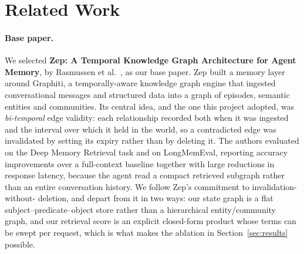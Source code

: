 \documentclass[11pt,a4paper]{article}
\begin{document}
\section{Related Work}
\label{sec:related}

\paragraph{Base paper.} We selected \textbf{Zep: A Temporal Knowledge Graph
Architecture for Agent Memory}, by Rasmussen et al.~\cite{rasmussen2025zep}, as
our base paper. Zep built a memory layer around Graphiti, a temporally-aware
knowledge graph engine that ingested conversational messages and structured
data into a graph of episodes, semantic entities and communities. Its central
idea, and the one this project adopted, was \emph{bi-temporal} edge validity:
each relationship recorded both when it was ingested and the interval over
which it held in the world, so a contradicted edge was invalidated by setting
its expiry rather than by deleting it. The authors evaluated on the Deep Memory
Retrieval task and on LongMemEval, reporting accuracy improvements over a
full-context baseline together with large reductions in response latency,
because the agent read a compact retrieved subgraph rather than an entire
conversation history. We follow Zep's commitment to invalidation-without-
deletion, and depart from it in two ways: our state graph is a flat
subject--predicate--object store rather than a hierarchical entity/community
graph, and our retrieval score is an explicit closed-form product whose terms
can be swept per request, which is what makes the ablation in
Section~\ref{sec:results} possible.
\end{document}
